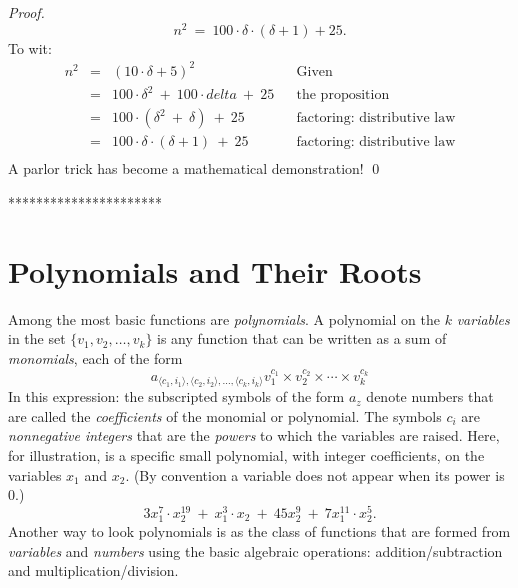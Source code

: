 {\begin{proof}
\[ n^2 \ = \ 100 \cdot \delta \cdot (\delta+1) + 25. \]
To wit: 
\[
\begin{array}{lclll}
n^2 & = & (10 \cdot \delta + 5)^2 & & \mbox{Given} \\
    & = & 100 \cdot \delta^2 \ + \ 100 \cdot delta \ + \ 25
              & & \mbox{the proposition} \\
    & = & 100 \cdot (\delta^2 \ + \ \delta) \ + \ 25
              & & \mbox{factoring: distributive law} \\
    & = & 100 \cdot \delta \cdot (\delta + 1) \ + \ 25
              & & \mbox{factoring: distributive law} \\
\end{array}
\]
A parlor trick has become a mathematical demonstration!
\qed
\end{proof}
**********************}


\section{Polynomials and Their Roots}
\label{sec:polynomials}

Among the most basic functions are {\it polynomials}.
 
A polynomial on the $k$ {\it variables} 
in the set $\{v_1, v_2, \ldots, v_k\}$ is any function that can be
written as a sum of {\it monomials}, 
 
each of the form
\[ a_{\langle c_1, i_1 \rangle, \langle c_2, i_2 \rangle, \ldots, 
\langle c_k, i_k \rangle} 
v_1^{c_1} \times v_2^{c_2} \times \cdots \times v_k^{c_k}
\]
In this expression: the subscripted symbols of the form $a_z$ denote
numbers that are called the {\it coefficients}
  of the
monomial or polynomial.  The symbols $c_i$ are {\em nonnegative
  integers} that are the {\it powers} 
 to which the variables are raised.  Here, for
illustration, is a specific small polynomial, with integer
coefficients, on the variables $x_1$ and $x_2$.  (By convention a
variable does not appear when its power is $0$.)
\[ 3 x_1^7 \cdot x_2^{19} \ + \ x_1^3 \cdot x_2 \ + \ 45 x_2^{9} \ + \ 
7 x_1^{11} \cdot x_2^{5}.
\]
Another way to look polynomials is as the class of functions that are
formed from {\it variables} and {\it numbers} using the basic
algebraic operations: addition/subtraction and
multiplication/division.

